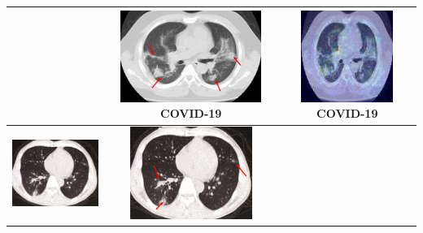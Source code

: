 \begin{longtable} { | c | c | c | }
\begin{minipage}{.3\textwidth}
    \vspace{0.5em}
    \end{minipage}
    &
  \begin{minipage}{.3\textwidth}
      \vspace{1em}
      \includegraphics[width=\linewidth, height=30mm]{Images/ctRadio2.png}
           \centering  COVID-19
               \vspace{0.5em}
    \end{minipage}
    & 
    \begin{minipage}{.3\textwidth}
        \vspace{1em}
      \includegraphics[width=\linewidth, height=30mm]{Images/ctHeatmap2.jpg}
      \centering COVID-19
          \vspace{0.5em}
    \end{minipage}
     \\ \hline
    \begin{minipage}{.3\textwidth}
    \vspace{1em}
      \includegraphics[width=\linewidth, height=30mm]{Images/ctOrig3.png}
    \vspace{0.5em}
    \end{minipage}
    &
  \begin{minipage}{.3\textwidth}
      \vspace{1em}
      \includegraphics[width=\linewidth, height=30mm]{Images/ctRadio3.png}

\end{minipage}
\end{longtable}
